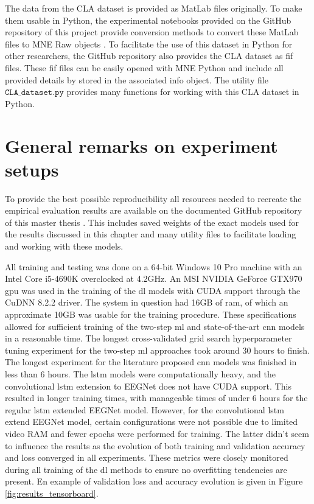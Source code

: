 The data from the CLA dataset is provided as MatLab files originally.
To make them usable in Python, the experimental notebooks provided on the GitHub repository of this project provide conversion methods to convert these MatLab files to MNE Raw objects \citep{github_project, mne}.
To facilitate the use of this dataset in Python for other researchers, the GitHub repository also provides the CLA dataset as \gls{fif} files.
These \gls{fif} files can be easily opened with MNE Python and include all provided details by \citet{eeg_data} stored in the associated info object.
The utility file $\texttt{CLA\_dataset.py}$ provides many functions for working with this CLA dataset in Python.

\section{General remarks on experiment setups}
\label{sec:evaluation_general_remarks}

To provide the best possible reproducibility all resources needed to recreate the empirical evaluation results are available on the documented GitHub repository of this master thesis \citep{github_project}.
This includes saved weights of the exact models used for the results discussed in this chapter and many utility files to facilitate loading and working with these models.

All training and testing was done on a 64-bit Windows 10 Pro machine with an Intel Core i5-4690K overclocked at 4.2GHz.
An MSI NVIDIA GeForce GTX970 \gls{gpu} was used in the training of the \gls{dl} models with CUDA support through the CuDNN 8.2.2 driver.
The system in question had 16GB of ram, of which an approximate 10GB was usable for the training procedure.
These specifications allowed for sufficient training of the two-step \gls{ml} and state-of-the-art \gls{cnn} models in a reasonable time.
The longest cross-validated grid search hyperparameter tuning experiment for the two-step \gls{ml} approaches took around 30 hours to finish.
The longest experiment for the literature proposed \gls{cnn} models was finished in less than 6 hours.
The \gls{lstm} models were computationally heavy, and the convolutional \gls{lstm} extension to EEGNet does not have CUDA support.
This resulted in longer training times, with manageable times of under 6 hours for the regular \gls{lstm} extended EEGNet model.
However, for the convolutional \gls{lstm} extend EEGNet model, certain configurations were not possible due to limited video RAM and fewer epochs were performed for training.
The latter didn't seem to influence the results as the evolution of both training and validation accuracy and loss converged in all experiments.
These metrics were closely monitored during all training of the \gls{dl} methods to ensure no overfitting tendencies are present.
En example of validation loss and accuracy evolution is given in Figure \ref{fig:results_tensorboard}.

